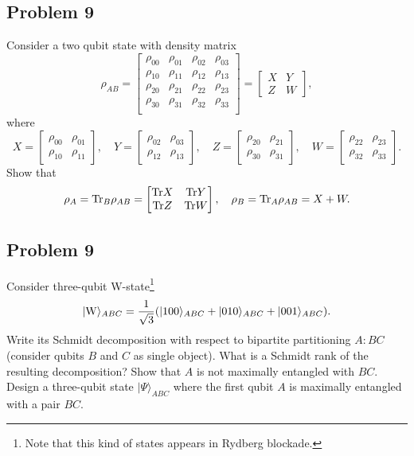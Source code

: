 \documentclass[a4paper,10pt]{article}
\newcommand{\ket}[1]{|#1\rangle}
\newcommand{\tr}{\ensuremath{{\rm Tr}}}
\begin{document}
\subsection*{Problem 9}
Consider a two qubit state with density matrix
\begin{equation}
	\rho_{AB} = \begin{bmatrix}
		\rho_{00} & \rho_{01} & \rho_{02} & \rho_{03} \\
		\rho_{10} & \rho_{11} & \rho_{12} & \rho_{13} \\
		\rho_{20} & \rho_{21} & \rho_{22} & \rho_{23} \\
		\rho_{30} & \rho_{31} & \rho_{32} & \rho_{33} \\
	\end{bmatrix} =
	\begin{bmatrix}
		X & Y \\
		Z & W
	\end{bmatrix},
\end{equation}
where
\begin{equation}
	X = 	\begin{bmatrix}
		\rho_{00} & \rho_{01} \\
		\rho_{10} & \rho_{11}
	\end{bmatrix}, \quad
	Y = 	\begin{bmatrix}
		\rho_{02} & \rho_{03} \\
		\rho_{12} & \rho_{13}
	\end{bmatrix}, \quad
	Z = 	\begin{bmatrix}
		\rho_{20} & \rho_{21} \\
		\rho_{30} & \rho_{31}
	\end{bmatrix}, \quad
	W = 	\begin{bmatrix}
		\rho_{22} & \rho_{23} \\
		\rho_{32} & \rho_{33}
	\end{bmatrix}.
\end{equation}
Show that
\begin{equation}
	\rho_{A} = \tr_{B}\rho_{AB} = 
	\begin{bmatrix}
		\tr X & \tr Y \\
		\tr Z & \tr W
	\end{bmatrix}, \quad
	\rho_{B} = \tr_{A}\rho_{AB}  = X+W.
\end{equation}


\subsection*{Problem 9}
Consider three-qubit W-state\footnote{Note that this kind of states appears in Rydberg blockade.}
\begin{equation}
	\ket{{\rm W}}_{ABC} = \frac{1}{\sqrt{3}}(\ket{100}_{ABC} + \ket{010}_{ABC} + \ket{001}_{ABC}).
\end{equation}
Write its Schmidt decomposition with respect to bipartite partitioning $A:BC$ (consider qubits $B$ and $C$ as single object).
What is a Schmidt rank of the resulting decomposition? 
Show that $A$ is not maximally entangled with $BC$.
Design a three-qubit state $\ket{\Psi}_{ABC}$ where the first qubit $A$ is maximally entangled with a pair $BC$.
\end{document}
